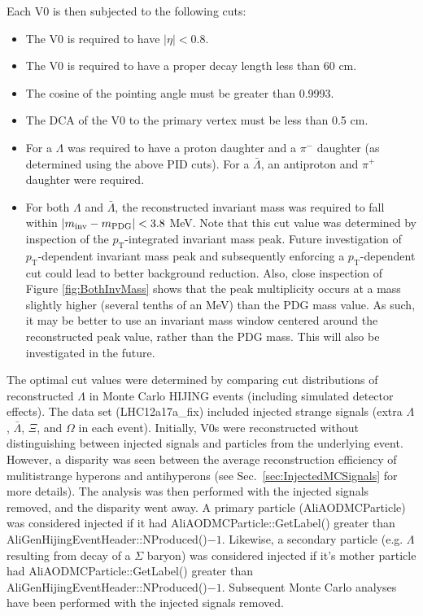 Each V0 is then subjected to the following cuts:
\begin{itemize}
\item The V0 is required to have $|\eta| < 0.8$.
\item The V0 is required to have a proper decay length less than 60 cm.
\item The cosine of the pointing angle must be greater than 0.9993.
\item The DCA of the V0 to the primary vertex must be less than 0.5 cm.
\item For a $\Lambda$ was required to have a proton daughter and a $\pi^-$ daughter (as determined using the above PID cuts).  For a $\bar{\Lambda}$, an antiproton and $\pi^+$ daughter were required.
\item For both $\Lambda$ and $\bar{\Lambda}$, the reconstructed invariant mass was required to fall within $\left\lvert m_\mathrm{inv}-m_\mathrm{PDG}\right\rvert < 3.8$ MeV.  Note that this cut value was determined by inspection of the $p_\mathrm{T}$-integrated invariant mass peak.  Future investigation of $p_\mathrm{T}$-dependent invariant mass peak and subsequently enforcing a $p_\mathrm{T}$-dependent cut could lead to better background reduction.  Also, close inspection of Figure \ref{fig:BothInvMass} shows that the peak multiplicity occurs at a mass slightly higher (several tenths of an MeV) than the PDG mass value.  As such, it may be better to use an invariant mass window centered around the reconstructed peak value, rather than the PDG mass.  This will also be investigated in the future.
\end{itemize}

The optimal cut values were determined by comparing cut distributions of reconstructed $\Lambda$ in Monte Carlo HIJING events (including simulated detector effects).  The data set (LHC12a17a\_fix) included injected strange signals (extra $\Lambda$, $\bar{\Lambda}$, $\Xi$, and $\Omega$ in each event).  Initially, V0s were reconstructed without distinguishing between injected signals and particles from the underlying event.  However, a disparity was seen between the average reconstruction efficiency of mulitistrange hyperons and antihyperons (see Sec.\ \ref{sec:InjectedMCSignals} for more details).  The analysis was then performed with the injected signals removed, and the disparity went away.  A primary particle (AliAODMCParticle) was considered injected if it had AliAODMCParticle::GetLabel() greater than AliGenHijingEventHeader::NProduced()$-1$. Likewise, a secondary particle (e.g. $\Lambda$ resulting from decay of a $\Sigma$ baryon) was considered injected if it's mother particle had AliAODMCParticle::GetLabel() greater than AliGenHijingEventHeader::NProduced()$-1$.  Subsequent Monte Carlo analyses have been performed with the injected signals removed.

